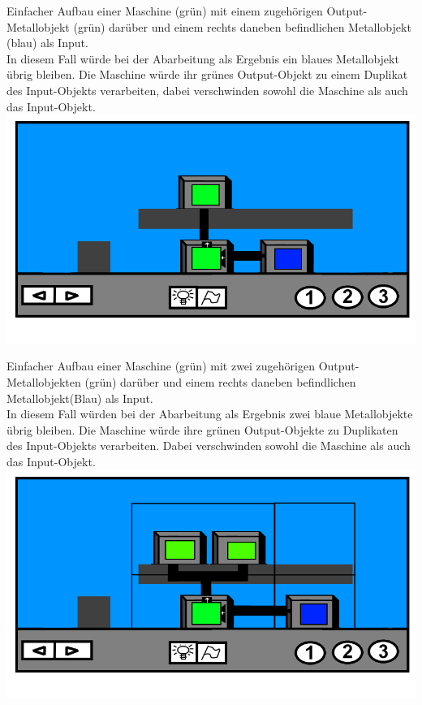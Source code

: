 \documentclass{scrartcl}
\begin{document}
\begin{description}
		\begin{minipage}{1\textwidth}
			Einfacher Aufbau einer Maschine (grün) mit einem zugehörigen Output-Metallobjekt (grün) darüber und einem rechts daneben befindlichen Metallobjekt (blau) als Input.\\
			In diesem Fall würde bei der Abarbeitung als Ergebnis ein blaues Metallobjekt übrig bleiben. Die Maschine würde ihr grünes Output-Objekt zu einem Duplikat des Input-Objekts verarbeiten, dabei verschwinden sowohl die Maschine als auch das Input-Objekt.\\
			\includegraphics[scale=0.5]{assets/LevelBsp1Out}\\
		\end{minipage}
		
		\begin{minipage}{1\textwidth}
			Einfacher Aufbau einer Maschine (grün) mit zwei zugehörigen Output-Metallobjekten (grün) darüber und einem rechts daneben befindlichen Metallobjekt(Blau) als Input.\\
			In diesem Fall würden bei der Abarbeitung als Ergebnis zwei blaue Metallobjekte übrig bleiben. Die Maschine würde ihre grünen Output-Objekte zu Duplikaten des Input-Objekts verarbeiten. Dabei verschwinden sowohl die Maschine als auch das Input-Objekt.\\
			\includegraphics[scale=0.5]{assets/LevelBsp2Out}\\
		\end{minipage}
		

\end{description}
\end{document}
